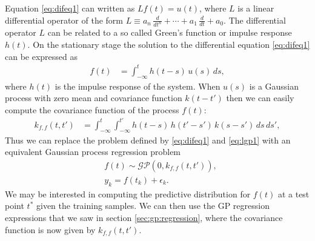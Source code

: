 \documentclass[journal]{IEEEtran}
\newcommand{\simo}[1]{{\color{red}#1}}
\begin{document}
Equation \eqref{eq:difeq1} can written as $L{f(t)}=u(t)$, where $L$ is a linear
differential operator of the form $L\equiv a_n \, \frac{d}{dt^{n}} + \cdots
  + a_1 \, \frac{d}{dt} + a_0 $. The differential operator $L$ can be related to a so called Green's function or
impulse response $h(t)$.
On the stationary stage the solution to the differential equation \eqref{eq:difeq1} can be expressed as
%
\begin{equation}
\begin{split}
  f(t) &= \int_{-\infty}^{t} h(t - s) \, u(s) \, ds,
\end{split}
\end{equation}
%
where $h(t)$ is the impulse response of the system. When $u(s)$ is a Gaussian process with zero mean and covariance function $k(t - t')$ then we can easily compute the covariance function of the process $f(t)$:
%
\begin{equation}
\begin{split}
  k_{f,f}(t, t') &=
  \int_{-\infty}^{t} \int_{-\infty}^{t'}
  h(t - s) \, h(t' - s') \, k(s - s') \, ds \, ds',
\end{split}
\label{eq:fcov}
\end{equation}
%
Thus we can replace the problem defined by \eqref{eq:difeq1} and \eqref{eq:lgp1} with an equivalent Gaussian process regression problem
%
\begin{eqnarray}
  &f(t) \sim \mathcal{GP}(0,k_{f, f}(t, t')), \label{eq:lgp2} \\
  &y_k = f(t_k) + \epsilon_k. \label{eq:meas2}
\end{eqnarray}
%
We may be interested in computing the predictive distribution for $f(t)$ at a test point $t^*$ given the training samples.
We can then use the GP regression expressions that we saw in section \ref{sec:gp:regression}, where the covariance
function is now given by $k_{f,f}(t,t')$.
\end{document}
